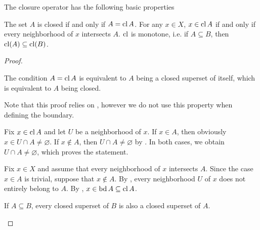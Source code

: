 \begin{proposition}\label{thm:closure_operator_properties}
  The closure operator has the following basic properties
  \begin{propenum}
     The set \( A \) is closed if and only if \( A = \operatorname{cl} A \).
     For any \( x \in X \), \( x \in \operatorname{cl} A \) if and only if every neighborhood of \( x \) intersects \( A \).
     \( \operatorname{cl} \) is monotone, i.e. if \( A \subseteq B \), then \( \operatorname{cl}(A) \subseteq \operatorname{cl}(B) \).
  \end{propenum}
\end{proposition}
\begin{proof}\mbox{}
  \begin{propenum}
     The condition \( A = \operatorname{cl}{A} \) is equivalent to \( A \) being a closed superset of itself, which is equivalent to \( A \) being closed.

     Note that this proof relies on , however we do not use this property when defining the boundary.

    \begin{description}
      \Implies Fix \( x \in \operatorname{cl}{A} \) and let \( U \) be a neighborhood of \( x \). If \( x \in A \), then obviously \( x \in U \cap A \neq \varnothing \). If \( x \not\in A \), then \( U \cap A \neq \varnothing \) by . In both cases, we obtain \( U \cap A \neq \varnothing \), which proves the statement.

      \ImpliedBy Fix \( x \in X \) and assume that every neighborhood of \( x \) intersects \( A \). Since the case \( x \in A \) is trivial, suppose that \( x \not\in A \). By , every neighborhood \( U \) of \( x \) does not entirely belong to \( A \). By , \( x \in \operatorname{bd} A \subseteq \operatorname{cl} A \).
    \end{description}

     If \( A \subseteq B \), every closed superset of \( B \) is also a closed superset of \( A \).
  \end{propenum}
\end{proof}

